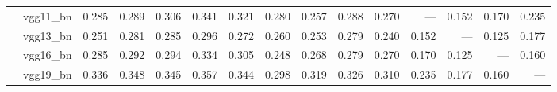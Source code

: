 \begin{table}
\begin{tabular}{llrrrrrrrrrrrrr}
       & vgg11_bn &                 0.285 &                 0.289 &                 0.306 &               0.341 &                   0.321 &                   0.280 &              0.257 &              0.288 &              0.270 &                 --- &               0.152 &               0.170 &               0.235 \\
       & vgg13_bn &                 0.251 &                 0.281 &                 0.285 &               0.296 &                   0.272 &                   0.260 &              0.253 &              0.279 &              0.240 &               0.152 &                 --- &               0.125 &               0.177 \\
       & vgg16_bn &                 0.285 &                 0.292 &                 0.294 &               0.334 &                   0.305 &                   0.248 &              0.268 &              0.279 &              0.270 &               0.170 &               0.125 &                 --- &               0.160 \\
       & vgg19_bn &                 0.336 &                 0.348 &                 0.345 &               0.357 &                   0.344 &                   0.298 &              0.319 &              0.326 &              0.310 &               0.235 &               0.177 &               0.160 &                 --- \\
\bottomrule
\end{tabular}
\end{table}
